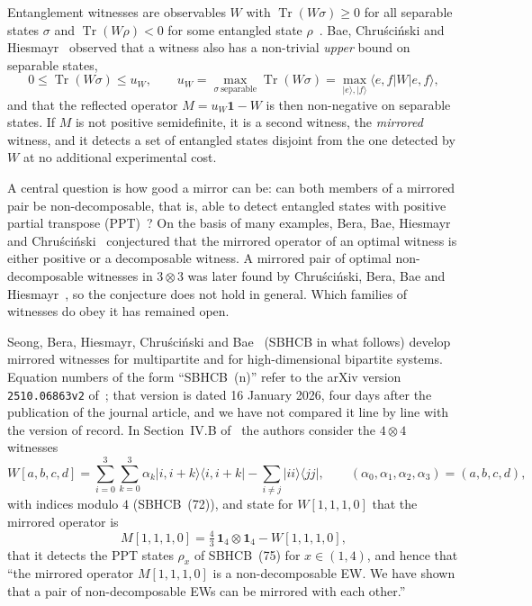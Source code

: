 \documentclass[11pt,a4paper]{article}
\theoremstyle{remark}
\newcommand{\ket}[1]{\lvert #1\rangle}
\newcommand{\bra}[1]{\langle #1\rvert}
\newcommand{\ketbra}[2]{\lvert #1\rangle\langle #2\rvert}
\newcommand{\id}{\mathbf{1}}
\newcommand{\tr}{\operatorname{Tr}}
\newcommand{\uW}{u_W}
\begin{document}
Entanglement witnesses are observables $W$ with $\tr(W\sigma)\ge0$ for all separable
states $\sigma$ and $\tr(W\rho)<0$ for some entangled state
$\rho$~\cite{HHH96,Terhal00,LKCH00,GT09,CS14}. Bae, Chru\'sci\'nski and
Hiesmayr~\cite{BCH20} observed that a witness also has a non-trivial \emph{upper} bound on
separable states,
\begin{equation}\label{eq:uW}
0\le\tr(W\sigma)\le\uW,\qquad \uW=\max_{\sigma\ \mathrm{separable}}\tr(W\sigma)
=\max_{\ket e,\ket f}\bra{e,f}W\ket{e,f},
\end{equation}
and that the reflected operator $M=\uW\id-W$ is then non-negative on separable states.
If $M$ is not positive semidefinite, it is a second witness, the \emph{mirrored} witness,
and it detects a set of entangled states disjoint from the one detected by $W$ at no
additional experimental cost.

A central question is how good a mirror can be: can both members of a mirrored pair be
non-decomposable, that is, able to detect entangled states with positive partial transpose
(PPT)~\cite{Peres96,HHH96}? On the basis of many examples, Bera, Bae, Hiesmayr and
Chru\'sci\'nski~\cite{BBHC23} conjectured that the mirrored operator of an optimal witness
is either positive or a decomposable witness. A mirrored pair of optimal non-decomposable
witnesses in $3\otimes3$ was later found by Chru\'sci\'nski, Bera, Bae and
Hiesmayr~\cite{CBBH25}, so the conjecture does not hold in general. Which families of
witnesses do obey it has remained open.

Seong, Bera, Hiesmayr, Chru\'sci\'nski and Bae~\cite{SBHCB26} (SBHCB in what follows)
develop mirrored witnesses for multipartite and for high-dimensional bipartite systems.
Equation numbers of the form ``SBHCB~(n)'' refer to the arXiv version
\texttt{2510.06863v2} of~\cite{SBHCB26}; that version is dated 16 January 2026, four days
after the publication of the journal article, and we have not compared it line by line
with the version of record. In Section~IV.B of~\cite{SBHCB26} the authors consider the
$4\otimes4$ witnesses
\begin{equation}\label{eq:W4}
W[a,b,c,d]=\sum_{i=0}^{3}\sum_{k=0}^{3}\alpha_k\ketbra{i,i+k}{i,i+k}-\sum_{i\neq j}\ketbra{ii}{jj},
\qquad (\alpha_0,\alpha_1,\alpha_2,\alpha_3)=(a,b,c,d),
\end{equation}
with indices modulo $4$ (SBHCB~(72)), and state for $W[1,1,1,0]$ that the mirrored operator
is
\begin{equation}\label{eq:M43}
M[1,1,1,0]=\tfrac43\,\id_4\otimes\id_4-W[1,1,1,0],
\end{equation}
that it detects the PPT states $\rho_x$ of SBHCB~(75) for $x\in(1,4)$, and hence that
``the mirrored operator $M[1,1,1,0]$ is a non-decomposable EW. We have shown that a pair of
non-decomposable EWs can be mirrored with each other.''
\end{document}
